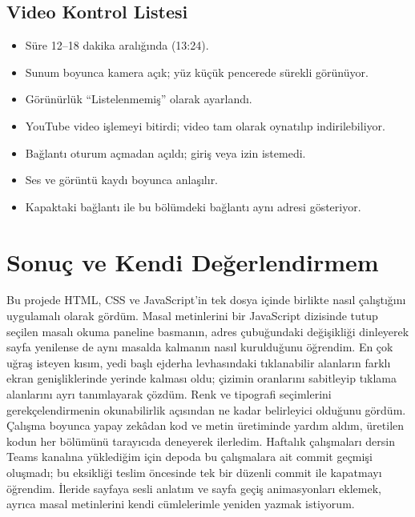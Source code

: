 \documentclass[11pt,a4paper]{article}
\begin{document}
\subsection{Video Kontrol Listesi}
\begin{itemize}
    \item[$\boxtimes$] Süre 12--18 dakika aralığında (13:24).
    \item[$\boxtimes$] Sunum boyunca kamera açık; yüz küçük pencerede sürekli görünüyor.
    \item[$\boxtimes$] Görünürlük ``Listelenmemiş'' olarak ayarlandı.
    \item[$\boxtimes$] YouTube video işlemeyi bitirdi; video tam olarak oynatılıp indirilebiliyor.
    \item[$\boxtimes$] Bağlantı oturum açmadan açıldı; giriş veya izin istemedi.
    \item[$\boxtimes$] Ses ve görüntü kaydı boyunca anlaşılır.
    \item[$\boxtimes$] Kapaktaki bağlantı ile bu bölümdeki bağlantı aynı adresi gösteriyor.
\end{itemize}

\section{Sonuç ve Kendi Değerlendirmem}
Bu projede HTML, CSS ve JavaScript'in tek dosya içinde birlikte nasıl çalıştığını uygulamalı olarak gördüm. Masal metinlerini bir JavaScript dizisinde tutup seçilen masalı okuma paneline basmanın, adres çubuğundaki değişikliği dinleyerek sayfa yenilense de aynı masalda kalmanın nasıl kurulduğunu öğrendim. En çok uğraş isteyen kısım, yedi başlı ejderha levhasındaki tıklanabilir alanların farklı ekran genişliklerinde yerinde kalması oldu; çizimin oranlarını sabitleyip tıklama alanlarını ayrı tanımlayarak çözdüm. Renk ve tipografi seçimlerini gerekçelendirmenin okunabilirlik açısından ne kadar belirleyici olduğunu gördüm. Çalışma boyunca yapay zekâdan kod ve metin üretiminde yardım aldım, üretilen kodun her bölümünü tarayıcıda deneyerek ilerledim. Haftalık çalışmaları dersin Teams kanalına yüklediğim için depoda bu çalışmalara ait commit geçmişi oluşmadı; bu eksikliği teslim öncesinde tek bir düzenli commit ile kapatmayı öğrendim. İleride sayfaya sesli anlatım ve sayfa geçiş animasyonları eklemek, ayrıca masal metinlerini kendi cümlelerimle yeniden yazmak istiyorum.
\end{document}
